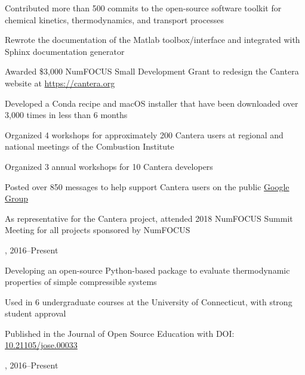 \begin{innerlist}
    \item Contributed more than 500 commits to the open-source software toolkit for chemical kinetics, thermodynamics, and transport processes
    \item Rewrote the documentation of the Matlab toolbox/interface and integrated with Sphinx documentation generator
    \item Awarded \$3,000 NumFOCUS Small Development Grant to redesign the Cantera website at \url{https://cantera.org}
    \item Developed a Conda recipe and macOS installer that have been downloaded over 3,000 times in less than 6 months
    \item Organized 4 workshops for approximately 200 Cantera users at regional and national meetings of the Combustion Institute
    \item Organized 3 annual workshops for 10 Cantera developers
    \item Posted over 850 messages to help support Cantera users on the public \href{https://groups.google.com/forum/#!forum/cantera-users}{Google Group}
    \item As representative for the Cantera project, attended 2018 NumFOCUS Summit Meeting for all projects sponsored by NumFOCUS
\end{innerlist}

\vspace{\baselineskip}

, \href{https://github.com/bryanwweber/thermostate}{} \hfill 2016--Present

\begin{innerlist}
    \item Developing an open-source Python-based package to evaluate thermodynamic properties of simple compressible systems
    \item Used in 6 undergraduate courses at the University of Connecticut, with strong student approval
    \item Published in the Journal of Open Source Education with DOI: \href{https://doi.org/10.21105/jose.00033}{10.21105/jose.00033}
\end{innerlist}

\vspace{\baselineskip}

, \href{https://github.com/pr-omethe-us/PyKED}{} \hfill 2016--Present

